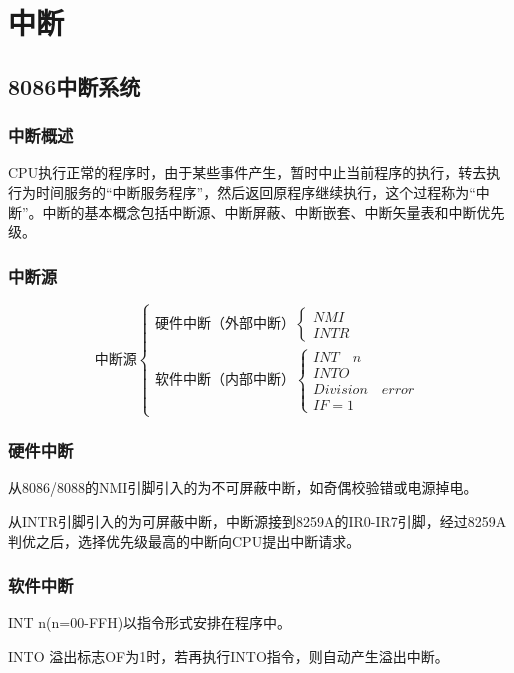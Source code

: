 \chapter{中断}
\section{8086中断系统}
\subsection{中断概述}
CPU执行正常的程序时，由于某些事件产生，暂时中止当前程序的执行，转去执行为时间服务的“中断服务程序”，然后返回原程序继续执行，这个过程称为“中断”。中断的基本概念包括中断源、中断屏蔽、中断嵌套、中断矢量表和中断优先级。
\subsection{中断源}
\begin{equation}
    \text{中断源}
    \begin{cases}
        \text{硬件中断（外部中断）}
        \begin{cases}
            NMI\\
            INTR
        \end{cases}
        \\
        \text{软件中断（内部中断）}
        \begin{cases}
            INT \quad n\\
            INTO \\
            Division \quad error\\
            IF=1
        \end{cases}
    \end{cases}
\end{equation}
\subsection{硬件中断}
从8086/8088的NMI引脚引入的为不可屏蔽中断，如奇偶校验错或电源掉电。

从INTR引脚引入的为可屏蔽中断，中断源接到8259A的IR0-IR7引脚，经过8259A判优之后，选择优先级最高的中断向CPU提出中断请求。
\subsection{软件中断}
INT n(n=00-FFH)以指令形式安排在程序中。

INTO 溢出标志OF为1时，若再执行INTO指令，则自动产生溢出中断。

